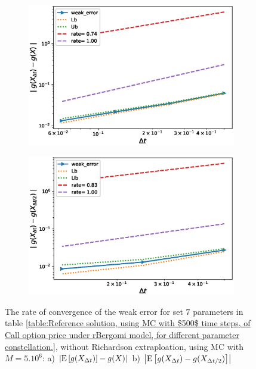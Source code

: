 \documentclass[11pt]{article}
\newcommand{\expt}[1]{\mathrm{E}\left[#1\right]}
\begin{document}
\begin{figure}[!htb]
	\centering
	\begin{subfigure}{.4\textwidth}
		\centering
		\includegraphics[width=1\linewidth]{./figures/rBergomi_weak_error_rates/without_richardson/H_002/weak_convergence_order_Bergomi_H_002_K_12_M_3_10_6_CI_relative}
		\caption{}
		\label{fig:sub3}
	\end{subfigure}%
	\begin{subfigure}{.4\textwidth}
		\centering
		\includegraphics[width=1\linewidth]{./figures/rBergomi_weak_error_rates/without_richardson/H_002/weak_convergence_order_differences_Bergomi_H_002_K_12_M_3_10_6_CI_relative}
		\caption{}
		\label{fig:sub4}
	\end{subfigure}
	
	\caption{The rate of convergence of the weak error for set $7$ parameters in table \ref{table:Reference solution, using MC with $500$ time steps, of Call option price under rBergomi model, for different parameter constellation.}, without Richardson extraploation, using MC with $M=5.10^6$: a) $\abs{\expt{g(X_{\Delta t})}-g(X)}$  b) $\abs{\expt{g(X_{\Delta t})-g(X_{\Delta t/2})}}$ }
	\label{fig:Weak_rate_H_002_without_rich_K_12}
\end{figure}
\end{document}
